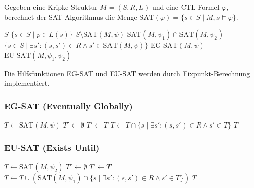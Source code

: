 ﻿\documentclass[a4paper,12pt]{article}
\theoremstyle{definition}
\begin{document}
Gegeben eine Kripke-Struktur $M = (S, R, L)$ und eine CTL-Formel $\varphi$, berechnet der SAT-Algorithmus die Menge $\text{SAT}(\varphi) = \{s \in S \mid M, s \models \varphi\}$.

\begin{algorithm}[H]
	\caption{CTL-ModellprÃ¼fung (SAT-Algorithmus)}
	\begin{algorithmic}[1]
		\State \Return $S$
		\State \Return $\{s \in S \mid p \in L(s)\}$
		\SonstWenn{$\varphi = \neg\psi$}
		\State \Return $S \setminus \text{SAT}(M, \psi)$
		\State \Return $\text{SAT}(M, \psi_1) \cap \text{SAT}(M, \psi_2)$
		\State \Return $\{s \in S \mid \exists s': (s,s') \in R \land s' \in \text{SAT}(M, \psi)\}$
		\State \Return $\text{EG-SAT}(M, \psi)$
		\State \Return $\text{EU-SAT}(M, \psi_1, \psi_2)$
		\EndeWenn
		\EndProzedur
	\end{algorithmic}
\end{algorithm}

Die Hilfsfunktionen EG-SAT und EU-SAT werden durch Fixpunkt-Berechnung implementiert.

\subsubsection{EG-SAT (Eventually Globally)}

\begin{algorithm}[H]
	\caption{EG-SAT-Berechnung}
	\begin{algorithmic}[1]
		\State $T \gets \text{SAT}(M, \psi)$ 
		\State $T' \gets \emptyset$
		\State $T' \gets T$
		\State $T \gets T \cap \{s \mid \exists s': (s,s') \in R \land s' \in T\}$ 
		\EndeWaehrend
		\State \Return $T$
		\EndProzedur
	\end{algorithmic}
\end{algorithm}

\subsubsection{EU-SAT (Exists Until)}

\begin{algorithm}[H]
	\caption{EU-SAT-Berechnung}
	\begin{algorithmic}[1]
		\State $T \gets \text{SAT}(M, \psi_2)$ 
		\State $T' \gets \emptyset$
		\State $T' \gets T$
		\State $T \gets T \cup (\text{SAT}(M, \psi_1) \cap \{s \mid \exists s': (s,s') \in R \land s' \in T\})$
		\EndeWaehrend
		\State \Return $T$
		\EndProzedur
	\end{algorithmic}
\end{algorithm}
\end{document}
